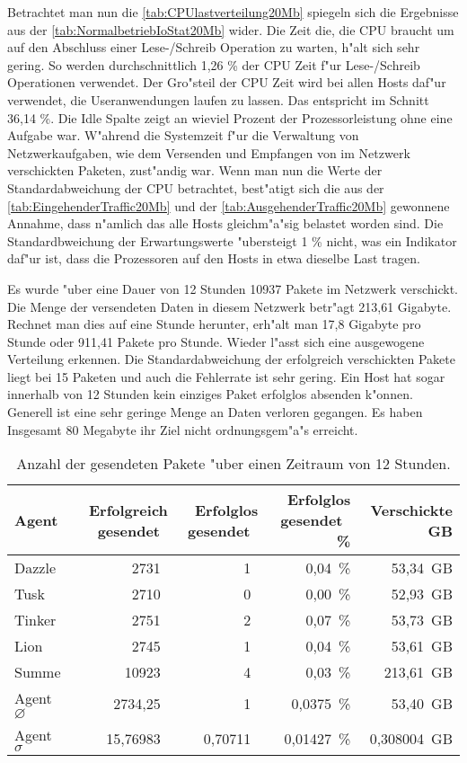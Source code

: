 Betrachtet man nun die \cref{tab:CPUlastverteilung20Mb} spiegeln sich die Ergebnisse aus der \cref{tab:NormalbetriebIoStat20Mb} wider. %
Die Zeit die, die CPU braucht um auf den Abschluss einer Lese-/Schreib Operation zu warten, h"alt sich sehr gering. %
So werden durchschnittlich 1,26 \% der CPU Zeit f"ur Lese-/Schreib Operationen verwendet. Der Gro"steil der CPU Zeit wird %
bei allen Hosts daf"ur verwendet, die Useranwendungen laufen zu lassen. Das entspricht im Schnitt 36,14 \%. Die Idle Spalte zeigt an wieviel Prozent der Prozessorleistung %
ohne eine Aufgabe war. W"ahrend die Systemzeit f"ur die Verwaltung von Netzwerkaufgaben, wie dem Versenden und Empfangen von %
im Netzwerk verschickten Paketen, zust"andig war. %
Wenn man nun die Werte der Standardabweichung der CPU betrachtet, best"atigt sich die aus der%
\cref{tab:EingehenderTraffic20Mb} und der \cref{tab:AusgehenderTraffic20Mb} gewonnene Annahme, dass n"amlich das alle Hosts gleichm"a"sig belastet worden sind. %
Die Standardbweichung der Erwartungswerte "ubersteigt 1 \% nicht, was ein Indikator daf"ur ist, dass die %
Prozessoren auf den Hosts in etwa dieselbe Last tragen.  

Es wurde "uber eine Dauer von 12 Stunden 10937 Pakete im Netzwerk verschickt. Die Menge der versendeten Daten in diesem Netzwerk betr"agt 213,61 Gigabyte. %
Rechnet man dies auf eine Stunde herunter, erh"alt man 17,8 Gigabyte pro Stunde oder 911,41 Pakete pro Stunde. Wieder l"asst sich eine ausgewogene Verteilung erkennen. %
Die Standardabweichung der erfolgreich verschickten Pakete liegt bei 15 Paketen und auch die Fehlerrate ist sehr gering. Ein Host %
hat sogar innerhalb von 12 Stunden kein einziges Paket erfolglos absenden k"onnen. Generell ist eine sehr geringe Menge an Daten verloren %
gegangen. Es haben Insgesamt 80 Megabyte ihr Ziel nicht ordnungsgem"a"s erreicht. %
\begin{table}
\centering
\begin{tabular}{l%
 r<{\,}%
 r<{\,}%
 r<{\,\%}%
 r<{\,GB}%
}
Agent  				& Erfolgreich gesendet			& Erfolglos gesendet			& Erfolglos gesendet	& Verschickte	\\
\hline
Dazzle 				& 2731			 		& 1					& 0,04			& 53,34			\\
Tusk 				& 2710					& 0					& 0,00			& 52,93			\\
Tinker				& 2751					& 2					& 0,07			& 53,73			\\
Lion				& 2745					& 1					& 0,04			& 53,61			\\ 
Summe				& 10923					& 4					& 0,03 			& 213,61		\\
Agent $\diameter $  		& 2734,25				& 1				 	& 0,0375		& 53,40 		\\   
Agent $\sigma $			& 15,76983	 			& 0,70711				& 0,01427      		& 0,308004		\\
\end{tabular}
\caption{Anzahl der gesendeten Pakete "uber einen Zeitraum von 12 Stunden.}
\label{tab:VerschickteDaten20Mb}
\end{table}


